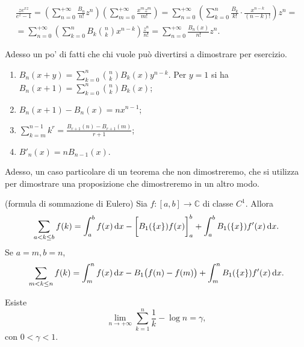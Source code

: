 \begin{oss}
  \begin{gather*}
    \frac{ze^{xz}}{e^z-1}=\left(\sum_{n=0}^{+\infty}\frac{B_n}{n!}z^n\right)\left(\sum_{m=0}^{+\infty}\frac{x^mz^m}{m!}\right)=\sum_{n=0}^{+\infty}\left(\sum_{k=0}^n\frac{B_k}{k!}\cdot \frac{x^{n-k}}{(n-k)!}\right)z^n= \\
    =\sum_{n=0}^{+\infty}\left(\sum_{k=0}^nB_k\binom{n}{k}x^{n-k}\right)\frac{z^n}{n!}=\sum_{n=0}^{+\infty}\frac{B_n(x)}{n!}z^n.
  \end{gather*}
\end{oss}

Adesso un po' di fatti che chi vuole può divertirsi a dimostrare per esercizio.

\begin{ftt}
  \begin{enumerate}
    \item $\displaystyle B_n(x+y)=\sum_{k=0}^n\binom{n}{k}B_k(x)y^{n-k}$. Per $y=1$ si ha $\displaystyle B_n(x+1)=\sum_{k=0}^n\binom{n}{k}B_k(x)$;
    \item $B_n(x+1)-B_n(x)=nx^{n-1}$;
    \item $\displaystyle \sum_{k=m}^{n-1} k^r=\frac{B_{r+1}(n)-B_{r+1}(m)}{r+1}$;
    \item $B'_n(x)=nB_{n-1}(x)$.
  \end{enumerate}
\end{ftt}

Adesso, un caso particolare di un teorema che non dimostreremo, che si utilizza per dimostrare una proposizione che dimostreremo in un altro modo.

\begin{thm}
  (formula di sommazione di Eulero) Sia $f:[a,b] \longrightarrow \mathbb{C}$ di classe $C^1$. Allora
  $$\sum_{a<k \le b}f(k)=\int_a^b f(x)\mathop{}\!\mathrm{d} x-\bigg[B_1(\{x\})f(x)\bigg]_a^b+\int_a^b B_1(\{x\})f'(x)\mathop{}\!\mathrm{d} x.$$
  Se $a=m, b=n$,
  $$\sum_{m<k \le n} f(k)=\int_m^nf(x)\mathop{}\!\mathrm{d} x-B_1\big(f(n)-f(m)\big)+\int_m^n B_1(\{x\})f'(x)\mathop{}\!\mathrm{d} x.$$
\end{thm}

\begin{prop}
  Esiste
  $$\lim_{n \longrightarrow +\infty} \sum_{k=1}^n \frac{1}{k}-\log{n}=\gamma,$$
  con $0<\gamma<1$.
\end{prop}
